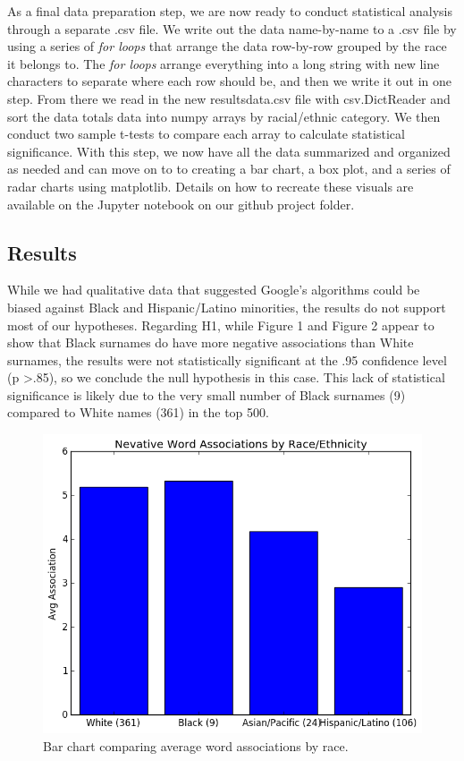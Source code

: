 \documentclass[sigconf]{acmart}
\begin{document}
As a final data preparation step, we are now ready to conduct statistical analysis through a separate .csv file. We write out the data name-by-name to a .csv file by using a series of {\em for loops} that arrange the data row-by-row grouped by the race it belongs to. The {\em for loops} arrange everything into a long string with new line characters to separate where each row should be, and then we write it out in one step. From there we read in the new resultsdata.csv file with csv.DictReader and sort the data totals data into numpy arrays by racial/ethnic category. We then conduct two sample t-tests to compare each array to calculate statistical significance. With this step, we now have all the data summarized and organized as needed and can move on to to creating a bar chart, a box plot, and a series of radar charts using matplotlib. Details on how to recreate these visuals are available on the Jupyter notebook on our github project folder.

\subsection{Results}

While we had qualitative data that suggested Google's algorithms could be biased against Black and Hispanic/Latino minorities, the results do not support most of our hypotheses. Regarding H1, while Figure 1 and Figure 2 appear to show that Black surnames do have more negative associations than White surnames, the results were not statistically significant at the .95 confidence level (p \textgreater .85), so we conclude the null hypothesis in this case. This lack of statistical significance is likely due to the very small number of Black surnames (9) compared to White names (361) in the top 500.

\begin{figure}
\includegraphics[width=\columnwidth]{images/fig1.png}
\caption{Bar chart comparing average word associations by race.}
\label{Figure 1}
\end{figure}
\end{document}
